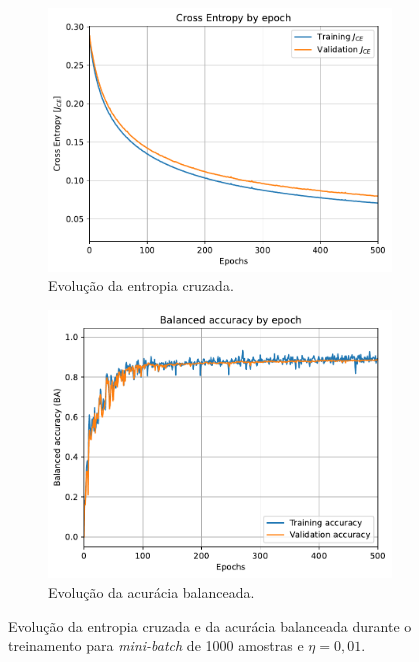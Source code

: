 \begin{figure}[H]
	\begin{subfigure}[H]{0.49\textwidth}
		\centering
		\includegraphics[width = 0.98\linewidth]{../../plot/LR_1/CE_500_epochs_batch_size1000}
		\caption{Evolução da entropia cruzada.}
		\label{fig:CE_500_epochs_batch_size1000}
	\end{subfigure}
	\begin{subfigure}[H]{0.49\textwidth}
		\centering
		\includegraphics[width = 0.99\linewidth]{../../plot/LR_1/BA_500_epochs_batch_size1000}
		\caption{Evolução da acurácia balanceada.}
		\label{fig:BA_500_epochs_batch_size1000}
	\end{subfigure}
	\caption{Evolução da entropia cruzada e da acurácia balanceada durante o treinamento para \textit{mini-batch} de 1000 amostras e $\eta = 0,01$.}
\end{figure}

